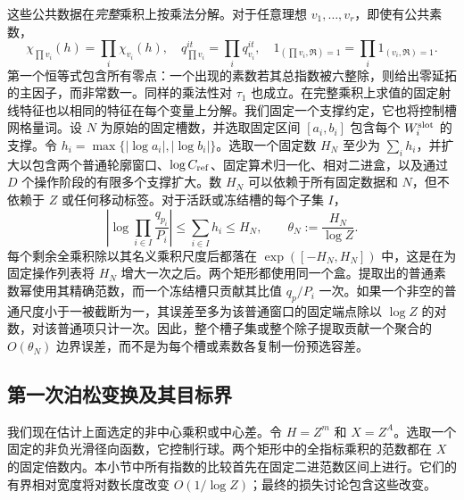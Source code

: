 \documentclass[11pt,a4paper]{article}
\numberwithin{equation}{section}
\numberwithin{figure}{section}
\theoremstyle{definition}
\theoremstyle{remark}
\begin{document}
这些公共数据在\emph{完整}乘积上按乘法分解。对于任意理想 \(v_1,\ldots,v_r\)，即使有公共素数，
\[
 \chi_{\prod v_i}(h)=\prod_i\chi_{v_i}(h),\quad
 q_{\prod v_i}^{it}=\prod_iq_{v_i}^{it},\quad
 1_{(\prod v_i,\mathfrak R)=1}
   =\prod_i1_{(v_i,\mathfrak R)=1}.
\]
第一个恒等式包含所有零点：一个出现的素数若其总指数被六整除，则给出零延拓的主因子，而非常数一。同样的乘法性对
\(\tau_1\) 也成立。在完整乘积上求值的固定射线特征也以相同的特征在每个变量上分解。我们固定一个支撑约定，它也将控制槽网格量词。设 \(N\) 为原始的固定槽数，并选取固定区间 \([a_i,b_i]\) 包含每个 \(W_i^{\rm slot}\) 的支撑。令
\(h_i=\max\{|\log a_i|,|\log b_i|\}\)。选取一个固定数
\(H_N\) 至少为 \(\sum_i h_i\)，并扩大以包含两个普通轮廓窗口、\(\log C_{\rm ref}\)、固定算术归一化、相对二进盒，以及通过 \(D\) 个操作阶段的有限多个支撑扩大。数 \(H_N\) 可以依赖于所有固定数据和 \(N\)，但不依赖于 \(Z\) 或任何移动标签。对于活跃或冻结槽的每个子集 \(I\)，
\begin{equation}
 \left|\log\prod_{i\in I}\frac{q_{p_i}}{P_i}\right|
 \le\sum_{i\in I}h_i\le H_N,
 \qquad \theta_N:=\frac{H_N}{\log Z}.
 \label{eq:centered-aggregate-support}
\end{equation}
每个剩余全乘积除以其名义乘积尺度后都落在 \(\exp([-H_N,H_N])\) 中，这是在为固定操作列表将 \(H_N\) 增大一次之后。两个矩形都使用同一个盒。提取出的普通素数幂使用其精确范数，而一个冻结槽只贡献其比值 \(q_p/P_i\) 一次。如果一个非空的普通尺度小于一被截断为一，其误差至多为该普通窗口的固定端点除以 \(\log Z\) 的对数，对该普通项只计一次。因此，整个槽子集或整个除子提取贡献一个聚合的 \(O(\theta_N)\) 边界误差，而不是为每个槽或素数各复制一份预选容差。

\subsection{第一次泊松变换及其目标界}\label{sec:plain-first-transform}

我们现在估计上面选定的非中心乘积或中心差。令 \(H=Z^m\) 和 \(X=Z^A\)。选取一个固定的非负光滑径向函数，它控制行球。两个矩形中的全指标乘积的范数都在 \(X\) 的固定倍数内。本小节中所有指数的比较首先在固定二进范数区间上进行。它们的有界相对宽度将对数长度改变 \(O(1/\log Z)\)；最终的损失讨论包含这些改变。
\end{document}
